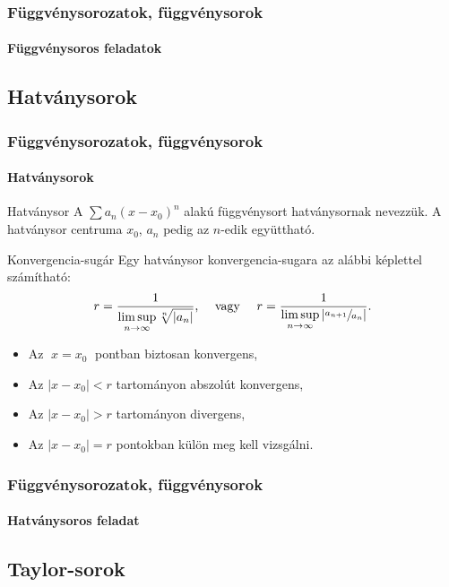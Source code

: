 \begin{frame}
  \frametitle{Függvénysorozatok, függvénysorok}
  \framesubtitle{Függvénysoros feladatok}

  
\end{frame}

\subsection{Hatványsorok}

\begin{frame}
  \frametitle{Függvénysorozatok, függvénysorok}
  \framesubtitle{Hatványsorok}

  \begin{block}{Hatványsor}
    A $\sum a_n (x - x_0)^n$ alakú függvénysort hatványsornak nevezzük.
    A hatványsor centruma $x_0$, $a_n$ pedig az $n$-edik együttható.
  \end{block}

  \begin{block}{Konvergencia-sugár}
    Egy hatványsor konvergencia-sugara az alábbi képlettel számítható:
    \[
      r = \frac{1}{\displaystyle\limsup_{n \rightarrow \infty} \sqrt[n]{|a_n|}}
      \text,
      \quad
      \text{ vagy }
      \quad
      r = \frac{1}{\displaystyle\limsup_{n \rightarrow \infty} \left|\sfrac{a_{n+1}}{a_n}\right| }
      \text.
    \]
    \begin{itemize}
      \item Az $\phantom{|}x = x_0\phantom{|}$ pontban biztosan konvergens,
      \item Az $|x - x_0| < r$ tartományon abszolút konvergens,
      \item Az $|x - x_0| > r$ tartományon divergens,
      \item Az $|x - x_0| = r$ pontokban külön meg kell vizsgálni.
    \end{itemize}
  \end{block}
\end{frame}

\begin{frame}
  \frametitle{Függvénysorozatok, függvénysorok}
  \framesubtitle{Hatványsoros feladat}

  
\end{frame}

\subsection{Taylor-sorok}

